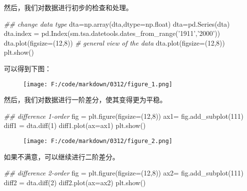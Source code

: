 \documentclass[]{article}
\newenvironment{Shaded}{}{}
\newcommand{\DecValTok}[1]{\textcolor[rgb]{0.25,0.63,0.44}{#1}}
\newcommand{\StringTok}[1]{\textcolor[rgb]{0.25,0.44,0.63}{#1}}
\newcommand{\CommentTok}[1]{\textcolor[rgb]{0.38,0.63,0.69}{\textit{#1}}}
\newcommand{\OperatorTok}[1]{\textcolor[rgb]{0.40,0.40,0.40}{#1}}
\newcommand{\BuiltInTok}[1]{#1}
\newcommand{\NormalTok}[1]{#1}
\begin{document}
然后，我们对数据进行初步的检查和处理。

\begin{Shaded}
\begin{Highlighting}[]
\CommentTok{## change data type}
\NormalTok{dta}\OperatorTok{=}\NormalTok{np.array(dta,dtype}\OperatorTok{=}\NormalTok{np.}\BuiltInTok{float}\NormalTok{)}
\NormalTok{dta}\OperatorTok{=}\NormalTok{pd.Series(dta)}
\NormalTok{dta.index }\OperatorTok{=}\NormalTok{ pd.Index(sm.tsa.datetools.dates_from_range(}\StringTok{'1911'}\NormalTok{,}\StringTok{'2000'}\NormalTok{))}
\NormalTok{dta.plot(figsize}\OperatorTok{=}\NormalTok{(}\DecValTok{12}\NormalTok{,}\DecValTok{8}\NormalTok{))}
\CommentTok{# general view of the data}
\NormalTok{dta.plot(figsize}\OperatorTok{=}\NormalTok{(}\DecValTok{12}\NormalTok{,}\DecValTok{8}\NormalTok{))}
\NormalTok{plt.show()}
\end{Highlighting}
\end{Shaded}

可以得到下图：

\begin{figure}
\centering
\texttt{[image: F:/code/markdown/0312/figure\_1.png]}
\caption{}
\end{figure}

然后，我们对数据进行一阶差分，使其变得更为平稳。

\begin{Shaded}
\begin{Highlighting}[]
\CommentTok{## difference 1-order}
\NormalTok{fig }\OperatorTok{=}\NormalTok{ plt.figure(figsize}\OperatorTok{=}\NormalTok{(}\DecValTok{12}\NormalTok{,}\DecValTok{8}\NormalTok{))}
\NormalTok{ax1}\OperatorTok{=}\NormalTok{ fig.add_subplot(}\DecValTok{111}\NormalTok{)}
\NormalTok{diff1 }\OperatorTok{=}\NormalTok{ dta.diff(}\DecValTok{1}\NormalTok{)}
\NormalTok{diff1.plot(ax}\OperatorTok{=}\NormalTok{ax1)}
\NormalTok{plt.show()}
\end{Highlighting}
\end{Shaded}

\begin{figure}
\centering
\texttt{[image: F:/code/markdown/0312/figure\_2.png]}
\caption{}
\end{figure}

如果不满意，可以继续进行二阶差分。

\begin{Shaded}
\begin{Highlighting}[]
\CommentTok{## difference 2-order}
\NormalTok{fig }\OperatorTok{=}\NormalTok{ plt.figure(figsize}\OperatorTok{=}\NormalTok{(}\DecValTok{12}\NormalTok{,}\DecValTok{8}\NormalTok{))}
\NormalTok{ax2}\OperatorTok{=}\NormalTok{ fig.add_subplot(}\DecValTok{111}\NormalTok{)}
\NormalTok{diff2 }\OperatorTok{=}\NormalTok{ dta.diff(}\DecValTok{2}\NormalTok{)}
\NormalTok{diff2.plot(ax}\OperatorTok{=}\NormalTok{ax2)}
\NormalTok{plt.show()}
\end{Highlighting}
\end{Shaded}
\end{document}
